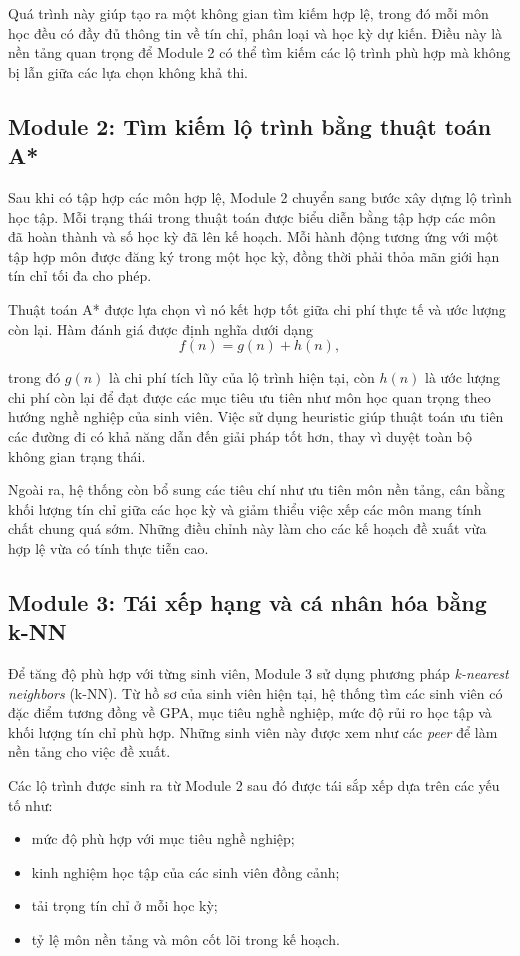 Quá trình này giúp tạo ra một không gian tìm kiếm hợp lệ, trong đó mỗi môn học đều có đầy đủ thông tin về tín chỉ, phân loại và học kỳ dự kiến. Điều này là nền tảng quan trọng để Module 2 có thể tìm kiếm các lộ trình phù hợp mà không bị lẫn giữa các lựa chọn không khả thi.

\subsection{Module 2: Tìm kiếm lộ trình bằng thuật toán A*}

Sau khi có tập hợp các môn hợp lệ, Module 2 chuyển sang bước xây dựng lộ trình học tập. Mỗi trạng thái trong thuật toán được biểu diễn bằng tập hợp các môn đã hoàn thành và số học kỳ đã lên kế hoạch. Mỗi hành động tương ứng với một tập hợp môn được đăng ký trong một học kỳ, đồng thời phải thỏa mãn giới hạn tín chỉ tối đa cho phép.

Thuật toán A* được lựa chọn vì nó kết hợp tốt giữa chi phí thực tế và ước lượng còn lại. Hàm đánh giá được định nghĩa dưới dạng
\begin{equation}
    f(n) = g(n) + h(n),
\end{equation}

trong đó $g(n)$ là chi phí tích lũy của lộ trình hiện tại, còn $h(n)$ là ước lượng chi phí còn lại để đạt được các mục tiêu ưu tiên như môn học quan trọng theo hướng nghề nghiệp của sinh viên. Việc sử dụng heuristic giúp thuật toán ưu tiên các đường đi có khả năng dẫn đến giải pháp tốt hơn, thay vì duyệt toàn bộ không gian trạng thái.

Ngoài ra, hệ thống còn bổ sung các tiêu chí như ưu tiên môn nền tảng, cân bằng khối lượng tín chỉ giữa các học kỳ và giảm thiểu việc xếp các môn mang tính chất chung quá sớm. Những điều chỉnh này làm cho các kế hoạch đề xuất vừa hợp lệ vừa có tính thực tiễn cao.

\subsection{Module 3: Tái xếp hạng và cá nhân hóa bằng k-NN}

Để tăng độ phù hợp với từng sinh viên, Module 3 sử dụng phương pháp \textit{k-nearest neighbors} (k-NN). Từ hồ sơ của sinh viên hiện tại, hệ thống tìm các sinh viên có đặc điểm tương đồng về GPA, mục tiêu nghề nghiệp, mức độ rủi ro học tập và khối lượng tín chỉ phù hợp. Những sinh viên này được xem như các \textit{peer} để làm nền tảng cho việc đề xuất.

Các lộ trình được sinh ra từ Module 2 sau đó được tái sắp xếp dựa trên các yếu tố như:
\begin{itemize}
    \item mức độ phù hợp với mục tiêu nghề nghiệp;
    \item kinh nghiệm học tập của các sinh viên đồng cảnh;
    \item tải trọng tín chỉ ở mỗi học kỳ;
    \item tỷ lệ môn nền tảng và môn cốt lõi trong kế hoạch.
\end{itemize}

